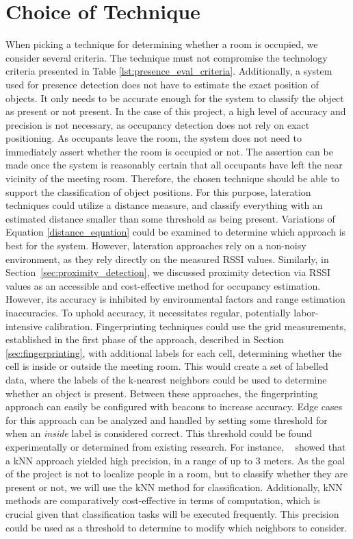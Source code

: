 \section{Choice of Technique}\label{sec:ChoiceOfTechnique}
When picking a technique for determining whether a room is occupied, we consider several criteria.
The technique must not compromise the technology criteria presented in Table \ref{lst:presence_eval_criteria}.
Additionally, a system used for presence detection does not have to estimate the exact position of objects.
It only needs to be accurate enough for the system to classify the object as present or not present.
In the case of this project, a high level of accuracy and precision is not necessary, as occupancy detection does not rely on exact positioning.
As occupants leave the room, the system does not need to immediately assert whether the room is occupied or not.
The assertion can be made once the system is reasonably certain that all occupants have left the near vicinity of the meeting room.
Therefore, the chosen technique should be able to support the classification of object positions.  
For this purpose, lateration techniques could utilize a distance measure, and classify everything with an estimated distance smaller than some threshold as being present.
Variations of Equation \ref{distance_equation} could be examined to determine which approach is best for the system.
However, lateration approaches rely on a non-noisy environment, as they rely directly on the measured RSSI values.
Similarly, in Section~\ref{sec:proximity_detection}, we discussed proximity detection via RSSI values as an accessible and cost-effective method for occupancy estimation. However, its accuracy is inhibited by environmental factors and range estimation inaccuracies. To uphold accuracy, it necessitates regular, potentially labor-intensive calibration.
Fingerprinting techniques could use the grid measurements, established in the first phase of the approach, described in Section \ref{sec:fingerprinting}, with additional labels for each cell, determining whether the cell is inside or outside the meeting room.
This would create a set of labelled data, where the labels of the k-nearest neighbors could be used to determine whether an object is present. 
Between these approaches, the fingerprinting approach can easily be configured with beacons to increase accuracy.
Edge cases for this approach can be analyzed and handled by setting some threshold for when an \textit{inside} label is considered correct. 
This threshold could be found experimentally or determined from existing research. 
For instance, \citeauthor{ble_kneares_neural}~\cite{ble_kneares_neural} showed that a kNN approach yielded high precision, in a range of up to 3 meters.
As the goal of the project is not to localize people in a room, but to classify whether they are present or not, we will use the kNN method for classification.
Additionally, kNN methods are comparatively cost-effective in terms of computation, which is crucial given that classification tasks will be executed frequently.
This precision could be used as a threshold to determine to modify which neighbors to consider.    
